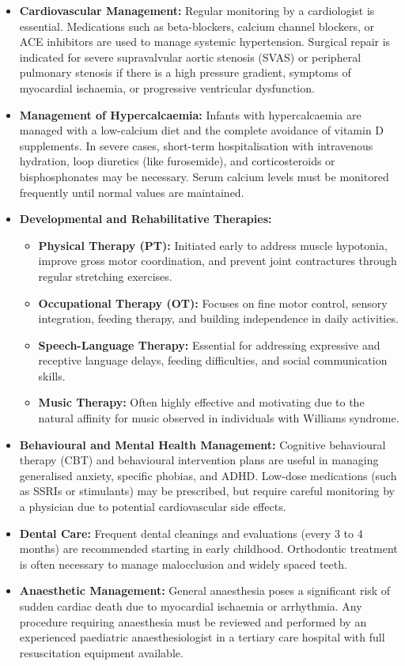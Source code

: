 \begin{itemize}
    \item \textbf{Cardiovascular Management:} Regular monitoring by a cardiologist is essential. Medications such as beta-blockers, calcium channel blockers, or ACE inhibitors are used to manage systemic hypertension. Surgical repair is indicated for severe supravalvular aortic stenosis (SVAS) or peripheral pulmonary stenosis if there is a high pressure gradient, symptoms of myocardial ischaemia, or progressive ventricular dysfunction.
    \item \textbf{Management of Hypercalcaemia:} Infants with hypercalcaemia are managed with a low-calcium diet and the complete avoidance of vitamin D supplements. In severe cases, short-term hospitalisation with intravenous hydration, loop diuretics (like furosemide), and corticosteroids or bisphosphonates may be necessary. Serum calcium levels must be monitored frequently until normal values are maintained.
    \item \textbf{Developmental and Rehabilitative Therapies:}
    \begin{itemize}
        \item \textbf{Physical Therapy (PT):} Initiated early to address muscle hypotonia, improve gross motor coordination, and prevent joint contractures through regular stretching exercises.
        \item \textbf{Occupational Therapy (OT):} Focuses on fine motor control, sensory integration, feeding therapy, and building independence in daily activities.
        \item \textbf{Speech-Language Therapy:} Essential for addressing expressive and receptive language delays, feeding difficulties, and social communication skills.
        \item \textbf{Music Therapy:} Often highly effective and motivating due to the natural affinity for music observed in individuals with Williams syndrome.
    \end{itemize}
    \item \textbf{Behavioural and Mental Health Management:} Cognitive behavioural therapy (CBT) and behavioural intervention plans are useful in managing generalised anxiety, specific phobias, and ADHD. Low-dose medications (such as SSRIs or stimulants) may be prescribed, but require careful monitoring by a physician due to potential cardiovascular side effects.
    \item \textbf{Dental Care:} Frequent dental cleanings and evaluations (every 3 to 4 months) are recommended starting in early childhood. Orthodontic treatment is often necessary to manage malocclusion and widely spaced teeth.
    \item \textbf{Anaesthetic Management:} General anaesthesia poses a significant risk of sudden cardiac death due to myocardial ischaemia or arrhythmia. Any procedure requiring anaesthesia must be reviewed and performed by an experienced paediatric anaesthesiologist in a tertiary care hospital with full resuscitation equipment available.
\end{itemize}

